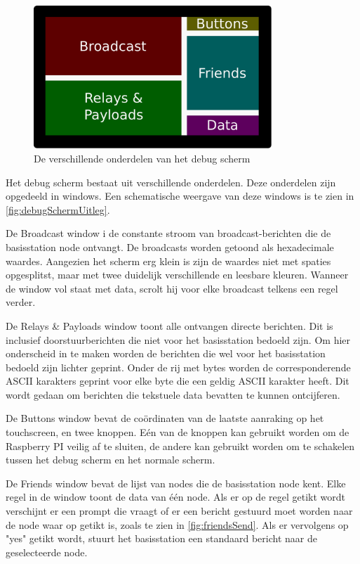 \begin{figure}[ht]
    \centering
    \includegraphics*[width=0.8\textwidth]{img/debugScreenExplain.pdf}
    \caption{De verschillende onderdelen van het debug scherm}
    \label{fig:debugSchermUitleg}
\end{figure}

Het debug scherm bestaat uit verschillende onderdelen. Deze onderdelen zijn opgedeeld in windows. Een schematische weergave van deze windows is te zien in \autoref{fig:debugSchermUitleg}.

De Broadcast window i de constante stroom van broadcast-berichten die de basisstation node ontvangt. De broadcasts worden getoond als hexadecimale waardes. Aangezien het scherm erg klein is zijn de waardes niet met spaties opgesplitst, maar met twee duidelijk verschillende en leesbare kleuren. Wanneer de window vol staat met data, scrolt hij voor elke broadcast telkens een regel verder.

De Relays \& Payloads window toont alle ontvangen directe berichten. Dit is inclusief doorstuurberichten die niet voor het basisstation bedoeld zijn. Om hier onderscheid in te maken worden de berichten die wel voor het basisstation bedoeld zijn lichter geprint. Onder de rij met bytes worden de corresponderende ASCII karakters geprint voor elke byte die een geldig ASCII karakter heeft. Dit wordt gedaan om berichten die tekstuele data bevatten te kunnen ontcijferen.

De Buttons window bevat de coördinaten van de laatste aanraking op het touchscreen, en twee knoppen. Eén van de knoppen kan gebruikt worden om de Raspberry PI veilig af te sluiten, de andere kan gebruikt worden om te schakelen tussen het debug scherm en het normale scherm.

De Friends window bevat de lijst van nodes die de basisstation node kent. Elke regel in de window toont de data van één node. Als er op de regel getikt wordt verschijnt er een prompt die vraagt of er een bericht gestuurd moet worden naar de node waar op getikt is, zoals te zien in \autoref{fig:friendsSend}. Als er vervolgens op "yes" getikt wordt, stuurt het basisstation een standaard bericht naar de geselecteerde node.

